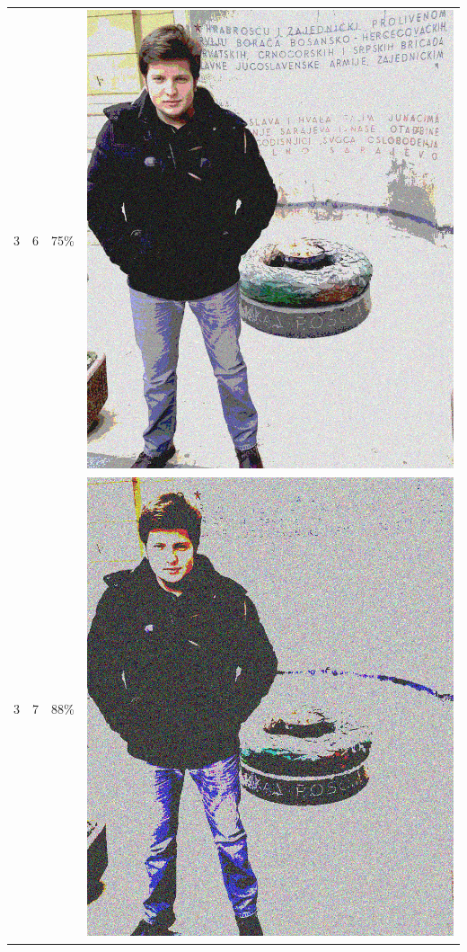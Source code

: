\documentclass[times, utf8, seminar]{fer}
\begin{document}
\begin{center}
\begin{longtable}{|c|c|c|c|}
3 & 6 &75\% & \includegraphics[scale=0.3]{../benchmark_results/pattern/3_components-6_bits.png} \\
3 & 7 &88\% & \includegraphics[scale=0.3]{../benchmark_results/pattern/3_components-7_bits.png} \\

\end{longtable}
\end{center}
\end{document}
